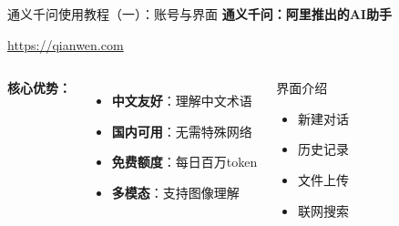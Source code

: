 
\begin{frame}{通义千问使用教程（一）：账号与界面}
	\textbf{通义千问：阿里推出的AI助手}

	\vspace{0.3cm}

	\begin{center}
		\normalsize
		\textcolor{blue}{\url{https://qianwen.com}}
	\end{center}

	\vspace{0.3cm}

	\begin{columns}
		\textbf{核心优势：}
		\begin{itemize}
			\item \textbf{中文友好}：理解中文术语
			\item \textbf{国内可用}：无需特殊网络
			\item \textbf{免费额度}：每日百万token
			\item \textbf{多模态}：支持图像理解
		\end{itemize}

		\begin{block}{界面介绍}
			\begin{itemize}
				\item 新建对话
				\item 历史记录
				\item 文件上传
				\item 联网搜索
			\end{itemize}
		\end{block}
	\end{columns}
\end{frame}

